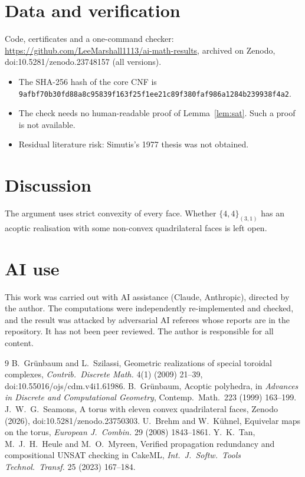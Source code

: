 \documentclass[11pt]{article}
\begin{document}
\section{Data and verification}
Code, certificates and a one-command checker: \url{https://github.com/LeeMarshall1113/ai-math-results}, archived on Zenodo, doi:10.5281/zenodo.23748157 (all versions).
\begin{itemize}
\item The SHA-256 hash of the core CNF is
  \texttt{9afbf70b30fd88a8\allowbreak c95839f163f25f1e\allowbreak e21c89f380faf986\allowbreak a1284b239938f4a2}.
\item The check needs no human-readable proof of Lemma~\ref{lem:sat}. Such a proof is not available.
\item Residual literature risk: Simutis's 1977 thesis was not obtained.
\end{itemize}

\section{Discussion}
The argument uses strict convexity of every face. Whether $\{4,4\}_{(3,1)}$ has an acoptic realisation with
some non-convex quadrilateral faces is left open.

\section*{AI use}
This work was carried out with AI assistance (Claude, Anthropic), directed by the author. The computations were
independently re-implemented and checked, and the result was attacked by adversarial AI referees whose reports are
in the repository. It has not been peer reviewed. The author is responsible for all content.

\begin{thebibliography}{9}
 B.~Gr\"unbaum and L.~Szilassi, Geometric realizations of special toroidal complexes,
  \emph{Contrib.\ Discrete Math.} 4(1) (2009) 21--39, doi:10.55016/ojs/cdm.v4i1.61986.
 B.~Gr\"unbaum, Acoptic polyhedra, in \emph{Advances in Discrete and Computational Geometry},
  Contemp.\ Math.\ 223 (1999) 163--199.
 J.~W.~G.~Seamons, A torus with eleven convex quadrilateral faces, Zenodo (2026),
  doi:10.5281/zenodo.23750303.
 U.~Brehm and W.~K\"uhnel, Equivelar maps on the torus, \emph{European J.\ Combin.} 29 (2008)
  1843--1861.
 Y.~K.~Tan, M.~J.~H.~Heule and M.~O.~Myreen, Verified propagation redundancy and compositional UNSAT
  checking in CakeML, \emph{Int.\ J.\ Softw.\ Tools Technol.\ Transf.} 25 (2023) 167--184.
\end{thebibliography}
\end{document}
